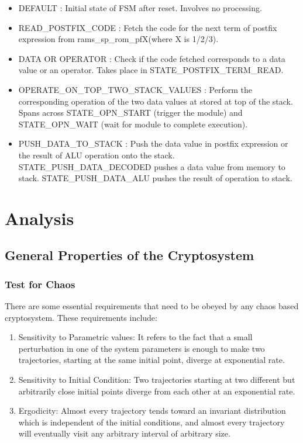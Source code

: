 \begin{itemize}
\item DEFAULT : Initial state of FSM after reset. Involves no processing.
\item READ\_POSTFIX\_CODE : Fetch the code for the next term of postfix expression from rams\_sp\_rom\_pfX(where X is 1/2/3).
\item DATA OR OPERATOR : Check if the code fetched corresponds to a data value or an operator. Takes place in STATE\_POSTFIX\_TERM\_READ.
\item OPERATE\_ON\_TOP\_TWO\_STACK\_VALUES : Perform the corresponding operation of the two data values at stored at top of the stack. Spans across STATE\_OPN\_START (trigger the module) and STATE\_OPN\_WAIT (wait for module to complete execution).
\item PUSH\_DATA\_TO\_STACK : Push the data value in postfix expression or the result of ALU operation onto the stack. STATE\_PUSH\_DATA\_DECODED pushes a data value from memory to stack. STATE\_PUSH\_DATA\_ALU pushes the result of operation to stack.
\end{itemize}


\section{Analysis}
\subsection{General Properties of the Cryptosystem}
\subsubsection{Test for Chaos}
There are some essential requirements that need to be obeyed by any chaos based cryptosystem. These requirements include:
\begin{enumerate}
	\item Sensitivity to Parametric values: It refers to the fact that a small perturbation in one of the system parameters is enough to make two trajectories, starting at the same initial point, diverge at exponential rate.
	\item Sensitivity to Initial  Condition:  Two  trajectories  starting  at  two  different  but  arbitrarily  close initial points diverge from each other at an exponential rate.
	\item Ergodicity:  Almost every trajectory tends toward an invariant distribution which is independent of the initial conditions, and almost every trajectory will eventually visit any arbitrary interval of arbitrary size.
\end{enumerate}


